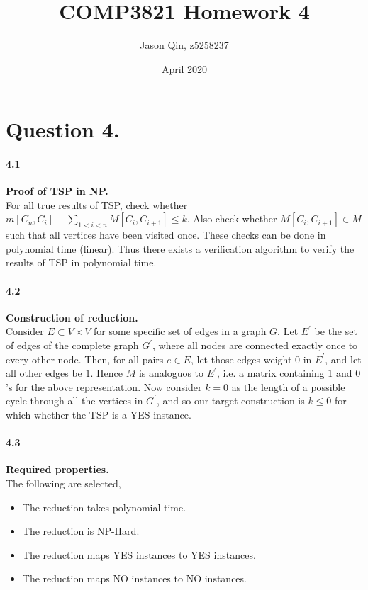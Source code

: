 \documentclass{article}
\title{COMP3821 Homework 4}
\author{Jason Qin, z5258237}
\date{April 2020}
\begin{document}
\maketitle

\section*{Question 4.}
\paragraph*{4.1} \textbf{Proof of TSP in NP.} \\

\noindent
For all true results of TSP, check whether $m[C_n, C_i] + \sum_{1<i<n} M[C_i, C_{i+1}] \leq k$.
Also check whether $M[C_i, C_{i+1}] \in M$ such that all vertices have been visited once.
These checks can be done in polynomial time (linear). Thus there exists a verification algorithm
to verify the results of TSP in polynomial time.

\paragraph*{4.2} \textbf{Construction of reduction.} \\

\noindent
Consider $E \subset V \times V$ for some specific set of edges in a graph $G$. Let $E^'$ be the set of edges
of the complete graph $G^'$, where all nodes are connected exactly once to every other node. Then, for all
pairs $e \in E$, let those edges weight $0$ in $E^'$, and let all other edges be $1$. Hence $M$ is analoguos
to $E^'$, i.e. a matrix containing $1$ and $0$'s for the above representation. Now consider $k = 0$ as the
length of a possible cycle through all the vertices in $G^'$, and so our target construction is $k \leq 0$ for which
whether the TSP is a YES instance.

\paragraph*{4.3} \textbf{Required properties.}  \\

\noindent
The following are selected,

\begin{itemize}
    \item The reduction takes polynomial time.
    \item The reduction is NP-Hard.
    \item The reduction maps YES instances to YES instances.
    \item The reduction maps NO instances to NO instances.
    \end{itemize}
\end{document}
